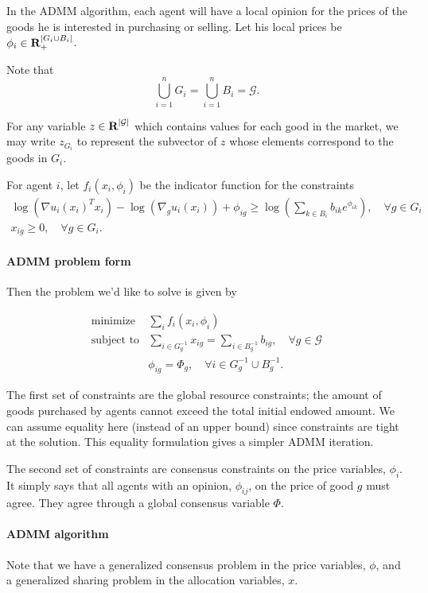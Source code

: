 \documentclass{article}
\begin{document}
In the ADMM algorithm, each agent will have a local opinion for the prices
of the goods he is interested in purchasing or selling.
Let his local prices
be $\phi_i \in {\mbox{\bf R}}_+^{|G_i \cup B_i|}$.

Note that
\[
\bigcup_{i=1}^n G_i = \bigcup_{i=1}^n B_i = \mathcal{G}.
\]

For any variable $z \in {\mbox{\bf R}}^{|\mathcal{G}|}$ which contains values for
each good in the market, we may write $z_{G_i}$ to represent the subvector
of $z$ whose elements correspond to the goods in $G_i$.

For agent $i$, let $f_i(x_i, \phi_i)$ be the indicator function for the constraints
\[
\begin{array}{c}
\log(\nabla u_i(x_i)^T x_i) - \log(\nabla_g u_i(x_i)) + \phi_{ig} \geq  \log\left(\sum\limits_{k \in B_i} b_{ik} e^{\phi_{ik}}\right),\quad \forall g \in G_i\\
x_{ig} \geq 0, \quad \forall g \in G_i.
\end{array}
\]

\paragraph{ADMM problem form} Then the problem we'd like to solve is given by

\[
\begin{array}{ll}
\mbox{minimize} & \sum_i f_i(x_i, \phi_i) \\
\mbox{subject to} & \sum\limits_{i \in G^{-1}_g} x_{ig} = \sum\limits_{i \in B^{-1}_g} b_{ig},\quad \forall g \in \mathcal{G}\\
& \phi_{ig} = \Phi_g,\quad \forall i \in G^{-1}_g \cup B^{-1}_g.
\end{array}
\]

The first set of constraints are the global resource constraints; the amount of
goods purchased by agents cannot exceed the total initial endowed amount.
We can assume equality here (instead of an upper bound)
since constraints are tight at the solution. This equality formulation gives
a simpler ADMM iteration.

The second set of constraints are consensus constraints on the price variables,
$\phi_i$. It simply says that all agents with an opinion, $\phi_{ij}$, on the price
of good $g$ must agree. They agree through a global consensus variable $\Phi$.


\paragraph{ADMM algorithm}
Note that we have a generalized consensus problem in the price variables,
$\phi$, and a generalized sharing problem in the allocation variables, $x$.
\end{document}
